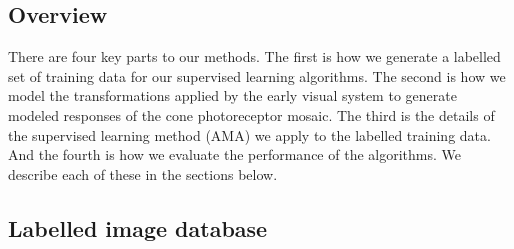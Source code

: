 \documentclass{jov}
\begin{document}
\subsection{Overview}
There are four key parts to our methods.  The first is how we generate a labelled set of training data for our supervised learning algorithms.  The second is how we model the transformations applied by the early visual system to generate modeled responses of the cone photoreceptor mosaic.  The third is the details of the supervised learning method (AMA) we apply to the labelled training data.  And the fourth is how we evaluate the performance of the algorithms.  We describe each of these in the sections below.

\subsection{Labelled image database} \label{method:VirtualWorld}
\end{document}
